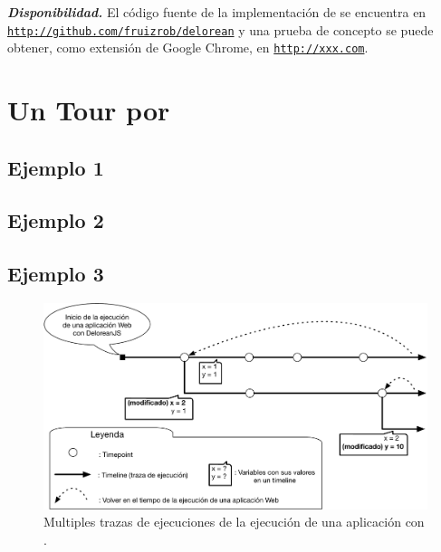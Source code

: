 \documentclass[conference]{IEEEtran}
\begin{document}
{\bf {\em Disponibilidad.}} El c\'odigo fuente de la implementaci\'on de \deloreanjs se encuentra en {\tt \url{http://github.com/fruizrob/delorean}} y una prueba de concepto se puede obtener, como extensi\'on de Google Chrome, en {\tt \url{http://xxx.com}}. 



\section{Un Tour por \deloreanjs}
\label{sec:tour}


\subsection{Ejemplo 1}
\label{sec:tour1}


\subsection{Ejemplo 2}
\label{sec:tour2}


\subsection{Ejemplo 3}
\label{sec:tour3}


\bigskip

\begin{figure}[t]
\begin{center}
\includegraphics[width=.7\linewidth]{fig-timeline}
\caption{Multiples trazas de ejecuciones de la ejecuci\'on de una aplicaci\'on con \deloreanjs.}
\label{fig:timeline}
\end{center}
\end{figure}
\end{document}
